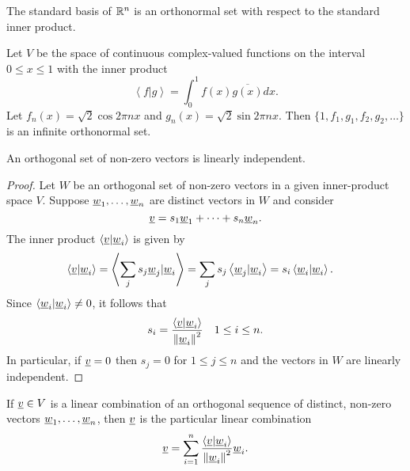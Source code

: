 \begin{example}
The standard basis of $\mathbb{R}^n$ is an orthonormal set with respect to the standard inner product.
\end{example}

\begin{example}
Let $V$ be the space of continuous complex-valued functions on the interval $0 \leq x \leq 1$ with the inner product
\begin{equation*}
\left\langle f | g \right\rangle = \int_0^1 f(x) \overline{g(x)} dx.
\end{equation*}
Let $f_n(x) = \sqrt{2} \cos 2 \pi n x$ and $g_n (x) = \sqrt{2} \sin 2 \pi n x$.
Then $\{ 1, f_1, g_1, f_2, g_2, \ldots \}$ is an infinite orthonormal set.
\end{example}

\begin{theorem}
An orthogonal set of non-zero vectors is linearly independent.
\end{theorem}
\begin{proof}
Let $W$ be an orthogonal set of non-zero vectors in a given inner-product space $V$.
Suppose $\underline{w}_1, \ldots, \underline{w}_n$ are distinct vectors in $W$ and consider
\begin{equation*}
\underline{v} = s_1 \underline{w}_1 + \cdots + s_n \underline{w}_n.
\end{equation*}
The inner product $\left\langle \underline{v} | \underline{w}_i \right\rangle$ is given by
\begin{equation*}
\begin{split}
\left\langle \underline{v} | \underline{w}_i \right\rangle
&= \left\langle \sum_j s_j \underline{w}_j | \underline{w}_i \right\rangle
= \sum_j s_j \left\langle \underline{w}_j | \underline{w}_i \right\rangle
= s_i \left\langle \underline{w}_i | \underline{w}_i \right\rangle .
\end{split}
\end{equation*}
Since $\left\langle \underline{w}_i | \underline{w}_i \right\rangle \neq 0$, it follows that
\begin{equation*}
s_i = \frac{ \left\langle \underline{v} | \underline{w}_i \right\rangle }
{ \left\| \underline{w}_i \right\|^2 }
\quad 1 \leq i \leq n.
\end{equation*}
In particular, if $\underline{v} = 0$ then $s_j = 0$ for $1 \leq j \leq n$ and the vectors in $W$ are linearly independent.
\end{proof}

\begin{corollary}
If $\underline{v} \in V$ is a linear combination of an orthogonal sequence of distinct, non-zero vectors $\underline{w}_1, \ldots, \underline{w}_n$, then $\underline{v}$ is the particular linear combination
\begin{equation*}
\underline{v} = \sum_{i = 1}^n \frac{ \left\langle \underline{v} | \underline{w}_i \right\rangle } { \left\| \underline{w}_i \right\|^2 } \underline{w}_i.
\end{equation*}
\end{corollary}

